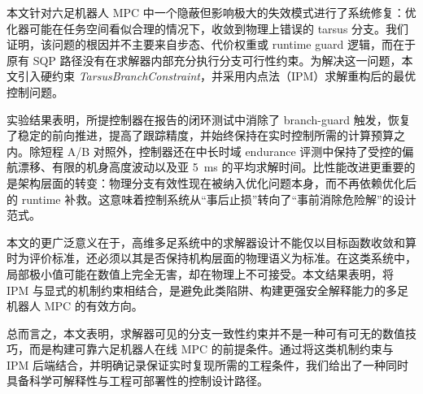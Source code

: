 本文针对六足机器人 MPC 中一个隐蔽但影响极大的失效模式进行了系统修复：优化器可能在任务空间看似合理的情况下，收敛到物理上错误的 tarsus 分支。我们证明，该问题的根因并不主要来自步态、代价权重或 runtime guard 逻辑，而在于原有 SQP 路径没有在求解器内部充分执行分支可行性约束。为解决这一问题，本文引入硬约束 \emph{TarsusBranchConstraint}，并采用内点法（IPM）求解重构后的最优控制问题。

实验结果表明，所提控制器在报告的闭环测试中消除了 branch-guard 触发，恢复了稳定的前向推进，提高了跟踪精度，并始终保持在实时控制所需的计算预算之内。除短程 A/B 对照外，控制器还在中长时域 endurance 评测中保持了受控的偏航漂移、有限的机身高度波动以及亚 5~ms 的平均求解时间。比性能改进更重要的是架构层面的转变：物理分支有效性现在被纳入优化问题本身，而不再依赖优化后的 runtime 补救。这意味着控制系统从“事后止损”转向了“事前消除危险解”的设计范式。

本文的更广泛意义在于，高维多足系统中的求解器设计不能仅以目标函数收敛和算时为评价标准，还必须以其是否保持机构层面的物理语义为标准。在这类系统中，局部极小值可能在数值上完全无害，却在物理上不可接受。本文结果表明，将 IPM 与显式的机制约束相结合，是避免此类陷阱、构建更强安全解释能力的多足机器人 MPC 的有效方向。

总而言之，本文表明，求解器可见的分支一致性约束并不是一种可有可无的数值技巧，而是构建可靠六足机器人在线 MPC 的前提条件。通过将这类机制约束与 IPM 后端结合，并明确记录保证实时复现所需的工程条件，我们给出了一种同时具备科学可解释性与工程可部署性的控制设计路径。
